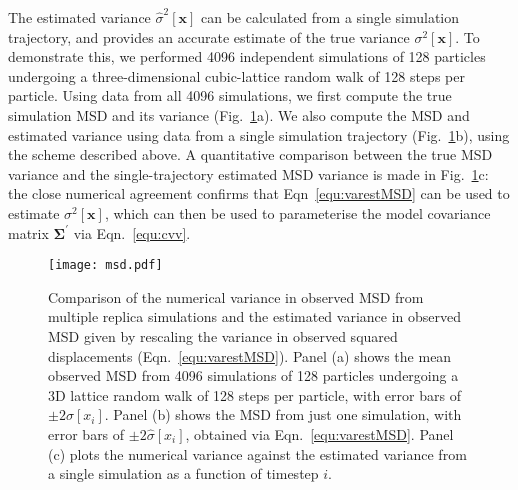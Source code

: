 \documentclass[reprint,superscriptaddress,nobibnotes,amsmath,amssymb,aps,prx,hidelinks,linenumbers]{revtex4-2}
\newcommand{\oMSD}{\ensuremath{\bm{x}}}
\newcommand{\oMSDi}{\ensuremath{x_i}}
\newcommand{\var}[1]{\ensuremath{\sigma^2[#1]}}
\newcommand{\varest}[1]{\ensuremath{\widehat{\sigma}^2[#1]}}
\begin{document}
The estimated variance $\varest{\oMSD}$ can be calculated from a single simulation trajectory, and provides an accurate estimate of the true variance $\var{\oMSD}$.
To demonstrate this, we performed \num{4096} independent simulations of \num{128} particles undergoing a three-dimensional cubic-lattice random walk of \num{128} steps per particle.
Using data from all \num{4096} simulations, we first compute the true simulation MSD and its variance (Fig.~\ref{fig:msd}a).
We also compute the MSD and estimated variance using data from a single simulation trajectory (Fig.~\ref{fig:msd}b), using the scheme described above.
A quantitative comparison between the true MSD variance and the single-trajectory estimated MSD variance is made in Fig.~\ref{fig:msd}c: the close numerical agreement confirms that Eqn~\ref{equ:varestMSD} can be used to estimate $\var{\oMSD}$, which can then be used to parameterise the model covariance matrix $\mathbf{\Sigma^\prime}$ via Eqn.~\ref{equ:cvv}.

\begin{figure}
    \centering
    \texttt{[image: msd.pdf]}
    \caption{
        Comparison of the numerical variance in observed MSD from multiple replica simulations and the estimated variance in observed MSD given by rescaling the variance in observed squared displacements (Eqn.~\ref{equ:varestMSD}).
        Panel (a) shows the mean observed MSD from \num{4096} simulations of \num{128} particles undergoing a 3D lattice random walk of \num{128} steps per particle, with error bars of $\pm2\sigma[\oMSDi]$.
        Panel (b) shows the MSD from just one simulation, with error bars of $\pm2\widehat{\sigma}[\oMSDi]$, obtained via Eqn.~\ref{equ:varestMSD}.
        Panel (c) plots the numerical variance against the estimated variance from a single simulation as a function of timestep $i$.
    }
    \label{fig:msd}
\end{figure}
\end{document}

